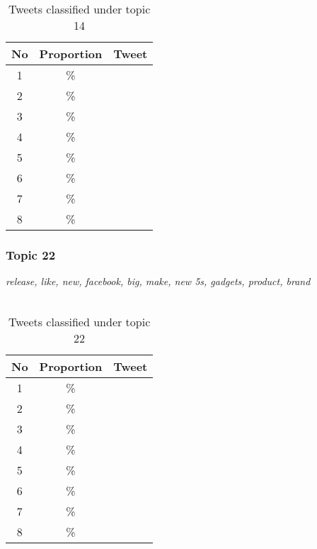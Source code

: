 \begin{table}[H]
  \begin{tabular}{c c p{13cm}} \toprule
    No & Proportion & Tweet \\ \midrule
    1  & \%       & \\ \midrule
    2  & \%       & \\ \midrule
    3  & \%       & \\ \midrule
    4  & \%       & \\ \midrule
    5  & \%       & \\ \midrule
    6  & \%       & \\ \midrule
    7  & \%       & \\ \midrule
    8  & \%       & \\ \bottomrule
  \end{tabular}
  \caption{Tweets classified under topic 14}
  \label{tab:tweets_under_14}
\end{table}



\subsubsection{Topic 22}
\label{sec:topic_22}
\textit{release, like, new, facebook, big, make, new 5s, gadgets, product, brand}\\\\

\begin{table}[H]
  \begin{tabular}{c c p{13cm}} \toprule
    No & Proportion & Tweet \\ \midrule
    1  & \%       & \\ \midrule
    2  & \%       & \\ \midrule
    3  & \%       & \\ \midrule
    4  & \%       & \\ \midrule
    5  & \%       & \\ \midrule
    6  & \%       & \\ \midrule
    7  & \%       & \\ \midrule
    8  & \%       & \\ \bottomrule
  \end{tabular}
  \caption{Tweets classified under topic 22}
  \label{tab:tweets_under_22}
\end{table}



